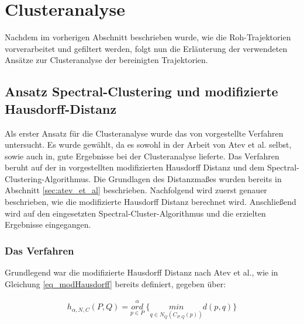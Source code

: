 
\section{Clusteranalyse}
\label{sec:realisation_clustering}


Nachdem im vorherigen Abschnitt beschrieben wurde, wie die Roh-Trajektorien vorverarbeitet und gefiltert
werden, folgt nun die Erläuterung der verwendeten Ansätze zur Clusteranalyse der bereinigten Trajektorien.

\subsection{Ansatz Spectral-Clustering und modifizierte Hausdorff-Distanz}
\label{sec:real_ansatz_spec_modHD}

Als erster Ansatz für die Clusteranalyse wurde das von \cite[]{Atev2010} vorgestellte Verfahren untersucht.
Es wurde gewählt, da es sowohl in der Arbeit von Atev et al. selbst, sowie auch in\cite[]{Morris2009}, gute Ergebnisse
bei der Clusteranalyse lieferte.
Das Verfahren beruht auf der in \cite[]{Atev2006} vorgestellten modifizierten Hausdorff Distanz und dem
Spectral-Clustering-Algorithmus. Die Grundlagen des Distanzmaßes wurden bereits in Abschnitt
\ref{sec:atev_et_al} beschrieben. Nachfolgend wird zuerst genauer beschrieben, wie die
modifizierte Hausdorff Distanz berechnet wird. Anschließend
wird auf den eingesetzten Spectral-Cluster-Algorithmus und die erzielten Ergebnisse eingegangen.

\subsubsection{Das Verfahren}

Grundlegend war die modifizierte Hausdorff Distanz nach Atev et al., wie in Gleichung \ref{eq_modHausdorff}
bereits definiert, gegeben über:

\begin{ceqn}
\begin{align*}
    h_{\alpha, N, C}(P, Q) = \overset{\alpha}{\underset{p \in P}{ord}}\ \Big\{ \underset{q \in N_Q(C_{P,Q}(p))}{min} d(p, q) \Big\}
\end{align*}
\end{ceqn}

